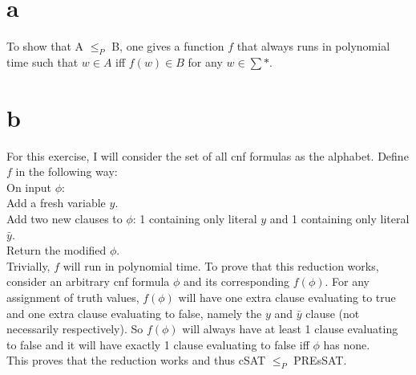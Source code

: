 \documentclass{article}
\begin{document}
\section{a}
To show that A $\leq_P$ B, one gives a function $f$ that always runs in polynomial time 
such that $w \in A$ iff $f(w) \in B$ for any $w \in \sum*$.

\section{b}
For this exercise, I will consider the set of all cnf formulas as the alphabet.
Define $f$ in the following way:\\
On input $\phi$:\\
Add a fresh variable $y$.\\
Add two new clauses to $\phi$: 1 containing only literal $y$ and 1 containing only literal $\bar{y}$.\\
Return the modified $\phi$.\\
Trivially, $f$ will run in polynomial time. 
To prove that this reduction works, consider an arbitrary cnf formula $\phi$ and its corresponding $f(\phi)$.
For any assignment of truth values, $f(\phi)$ will have one extra clause evaluating to true and one extra clause evaluating to false,
namely the $y$ and $\bar{y}$ clause (not necessarily respectively). 
So $f(\phi)$ will always have at least 1 clause evaluating to false and it will have exactly 1 clause evaluating to false iff $\phi$ has none.\\
This proves that the reduction works and thus cSAT $\leq_P$ PREsSAT.
\end{document}
